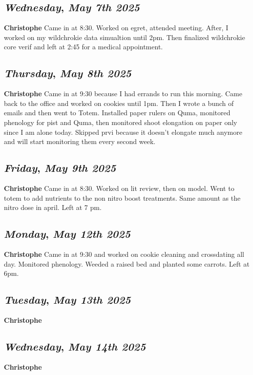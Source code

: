 \def\day{\textit{May 7th 2025}}
\def\weekday{\textit{Wednesday}}
\subsection*{\weekday, \day}
\textbf {Christophe}
Came in at 8:30. Worked on egret, attended meeting. After, I worked on my wildchrokie data simualtion until 2pm. Then finalized wildchrokie core verif and left at 2:45 for a medical appointment. 

\def\day{\textit{May 8th 2025}}
\def\weekday{\textit{Thursday}}
\subsection*{\weekday, \day}
\textbf {Christophe}
Came in at 9:30 because I had errands to run this morning. Came back to the office and worked on cookies until 1pm. Then I wrote a bunch of emails and then went to Totem. Installed paper rulers on Quma, monitored phenology for pist and Quma, then monitored shoot elongation on paper only since I am alone today. Skipped prvi because it doesn't elongate much anymore and will start monitoring them every second week. 

\def\day{\textit{May 9th 2025}}
\def\weekday{\textit{Friday}}
\subsection*{\weekday, \day}
\textbf {Christophe}
Came in at 8:30. Worked on lit review, then on model. Went to totem to add nutrients to the non nitro boost treatments. Same amount as the nitro dose in april. Left at 7 pm.

\def\day{\textit{May 12th 2025}}
\def\weekday{\textit{Monday}}
\subsection*{\weekday, \day}
\textbf {Christophe}
Came in at 9:30 and worked on cookie cleaning and crossdating all day. Monitored phenology. Weeded a raised bed and planted some carrots. Left at 6pm. 
\def\day{\textit{May 13th 2025}}
\def\weekday{\textit{Tuesday}}
\subsection*{\weekday, \day}
\textbf {Christophe}

\def\day{\textit{May 14th 2025}}
\def\weekday{\textit{Wednesday}}
\subsection*{\weekday, \day}
\textbf {Christophe}


